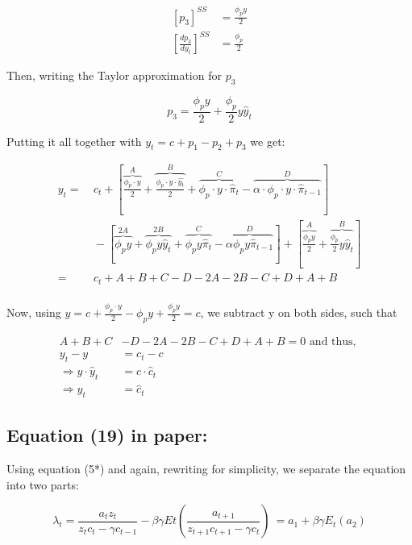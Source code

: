 \documentclass[11pt,preprint, authoryear]{elsarticle}
\numberwithin{equation}{section}
\numberwithin{figure}{section}
\numberwithin{table}{section}
\begin{document}
\[\begin{aligned}
\left[ p_{3} \right]^{SS} &= \frac{\phi_{p} y} {2}\\\left[ \frac{dp_{3}}{dy_{t}} \right]^{SS} &= \frac{\phi_{p}}{2}
\end{aligned}\]

Then, writing the Taylor approximation for \(p_{3}\)

\[p_{3} = \frac{\phi_{p} y} {2} + \frac{\phi_{p}}{2}y \hat{y}_{t}\]

Putting it all together with \(y_{t} = c + p_{1} - p_{2} + p_{3}\) we
get:

\[\begin{aligned}
y_{t} = & \ c_t  +\left[ \overbrace{\frac{\phi_{p} \cdot y}{2}}^{A} + \overbrace{\frac{\phi_{p} \cdot y \cdot \hat{y_{t}} }{2}}^{B} + \overbrace{\phi_{p} \cdot y \cdot \hat{\pi}_{t}}^{C} - \overbrace{\alpha \cdot \phi_{p} \cdot y \cdot \hat{\pi}_{t-1}}^{D} \right] \\ & \ - \left[ \overbrace{\phi_{p} y}^{2A} + \overbrace{\phi_{p} y \hat{y}_{t}}^{2B} + \overbrace{ \phi_{p} y \hat{\pi}_{t}}^{C} - \overbrace{\alpha \phi_{p} y \hat{\pi}_{t-1}}^{D} \right] + \left[ \overbrace{\frac{\phi_{p} y} {2}}^{A} + \overbrace{\frac{\phi_{p}}{2}y \hat{y}_{t}}^{B} \right] \\= &\  c_{t} + A + B + C -D - 2A - 2B - C + D + A + B\\
\end{aligned}\]

Now, using
\(y = c + \frac{\phi_{p} \cdot y}{2} - \phi_{p} y + \frac{\phi_{p} y} {2} = c\),
we subtract y on both sides, such that

\[\begin{aligned}
A + B + C &- D - 2A - 2B - C + D + A + B = 0
\text{ and thus, }
\\
y_{t} - y &= c_t - c
\\
\Rightarrow y \cdot \hat{y}_t &= c \cdot \hat{c}_t
\\
\Rightarrow \hat{y}_t &= \hat{c}_t
\end{aligned}\]

\hypertarget{equation-19-in-paper}{%
\subsection{Equation (19) in paper:}\label{equation-19-in-paper}}

Using equation (5*) and again, rewriting for simplicity, we separate the
equation into two parts:

\[\lambda_{t}=\frac{a_{t} z_{t}}{z_{t} c_{t}-\gamma c_{t-1}}-\beta \gamma E{t}\left(\frac{a_{t+1}}{z_{t+1} c_{t+1}-\gamma c_{t}}\right)\
= a_1 + \beta \gamma E_t (a_2)\]
\end{document}
